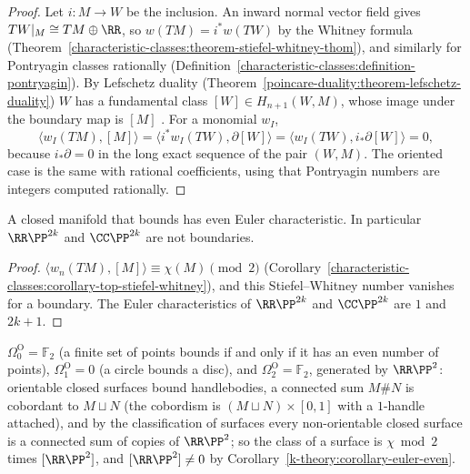 \begin{proof}
Let $i \colon M \to W$ be the inclusion. An inward normal vector field gives $TW|_M \cong TM \oplus \RR$, so $w(TM) = i^*w(TW)$ by the Whitney formula
(Theorem~\ref{characteristic-classes:theorem-stiefel-whitney-thom}), and similarly for Pontryagin classes rationally (Definition~\ref{characteristic-classes:definition-pontryagin}). By Lefschetz duality
(Theorem~\ref{poincare-duality:theorem-lefschetz-duality}) $W$ has a fundamental class $[W] \in H_{n+1}(W, M)$, whose image under the boundary map is $[M]$ \cite[Theorem 3.43]{hatcher-at}. For a monomial $w_I$,
\[
\langle w_I(TM), [M]\rangle = \langle i^*w_I(TW), \partial[W]\rangle = \langle w_I(TW), i_*\partial[W]\rangle = 0,
\]
because $i_*\partial = 0$ in the long exact sequence of the pair $(W, M)$. The oriented case is the same with rational coefficients, using that Pontryagin numbers are integers computed rationally.
\end{proof}

\begin{corollary}\label{k-theory:corollary-euler-even}
A closed manifold that bounds has even Euler characteristic. In particular $\RR\PP^{2k}$ and $\CC\PP^{2k}$ are not boundaries.
\end{corollary}

\begin{proof}
$\langle w_n(TM), [M]\rangle \equiv \chi(M) \pmod 2$ (Corollary~\ref{characteristic-classes:corollary-top-stiefel-whitney}), and this Stiefel--Whitney number vanishes for a boundary. The Euler characteristics of
$\RR\PP^{2k}$ and $\CC\PP^{2k}$ are $1$ and $2k + 1$.
\end{proof}

\begin{example}\label{k-theory:example-low-cobordism}
$\Omega^{\mathrm{O}}_0 = \mathbb{F}_2$ (a finite set of points bounds if and only if it has an even number of points), $\Omega^{\mathrm{O}}_1 = 0$ (a circle bounds a disc), and $\Omega^{\mathrm{O}}_2 = \mathbb{F}_2$, generated by
$\RR\PP^2$: orientable closed surfaces bound handlebodies, a connected sum $M \# N$ is cobordant to $M \sqcup N$ (the cobordism is $(M \sqcup N) \times [0, 1]$ with a $1$-handle attached), and by the classification of
surfaces every non-orientable closed surface is a connected sum of copies of $\RR\PP^2$; so the class of a surface is $\chi \bmod 2$ times $[\RR\PP^2]$, and $[\RR\PP^2] \neq 0$ by
Corollary~\ref{k-theory:corollary-euler-even}.
\end{example}

